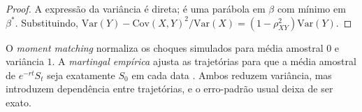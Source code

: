 \begin{proof}
A expressão da variância é direta; é uma parábola em $\beta$ com mínimo em $\beta^*$. Substituindo, $\mathrm{Var}(Y)-\mathrm{Cov}(X,Y)^2/\mathrm{Var}(X)=(1-\rho_{XY}^2)\mathrm{Var}(Y)$.
\end{proof}

\begin{definicao}
O \emph{moment matching} normaliza os choques simulados para média amostral $0$ e variância $1$. A \emph{martingal empírica} ajusta as trajetórias para que a média amostral de $e^{-rt}S_t$ seja exatamente $S_0$ em cada data \citep{duansimonato1998}. Ambos reduzem variância, mas introduzem dependência entre trajetórias, e o erro-padrão usual deixa de ser exato.
\end{definicao}
